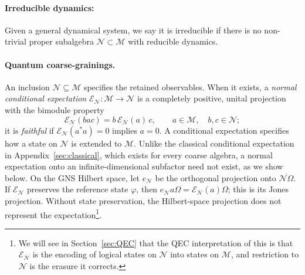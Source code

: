 \documentclass[a4paper,11pt]{article}
\theoremstyle{definition}
\newcommand{\mN}{\mathcal{N}}
\newcommand{\mM}{\mathcal{M}}
\newcommand{\mE}{\mathcal{E}}
\begin{document}
\paragraph{Irreducible dynamics:} Given a general dynamical system, we say it is irreducible if there is no non-trivial proper subalgebra $\mN\subset \mM$ with reducible dynamics.

\paragraph{Quantum coarse-grainings.}
An inclusion $\mN\subseteq\mM$ specifies the retained observables.
When it exists, a \emph{normal conditional expectation}
$\mE_{\mN}:\mM\to\mN$ is a completely positive, unital projection
with the bimodule property
\begin{equation}
 \mE_{\mN}(bac)=b\,\mE_{\mN}(a)\,c,
 \qquad a\in\mM,\quad b,c\in\mN;
 \label{eq:CE-bimodular}
\end{equation}
it is \emph{faithful} if $\mE_{\mN}(a^*a)=0$ implies $a=0$. A conditional expectation specifies how a state on $\mN$ is extended to $\mM$.
Unlike the classical conditional expectation in Appendix~\ref{sec:classical}, which exists for every coarse algebra,
a normal expectation onto an infinite-dimensional subfactor need not exist, as we show below. On the GNS Hilbert space, let $e_{\mN}$
be the orthogonal projection onto $\overline{\mN\Omega}$.
If $\mE_{\mN}$ preserves the reference state $\varphi$, then
$e_{\mN}a\Omega=\mE_{\mN}(a)\Omega$; this is its Jones projection.
Without state preservation, the Hilbert-space projection does not represent the expectation\footnote{We will see in Section~\ref{sec:QEC} that the QEC interpretation of this is that $\mE_{\mN}$ is the encoding of logical states on $\mN$
into states on $\mM$, and restriction to $\mN$ is the erasure it corrects.}.
\end{document}
